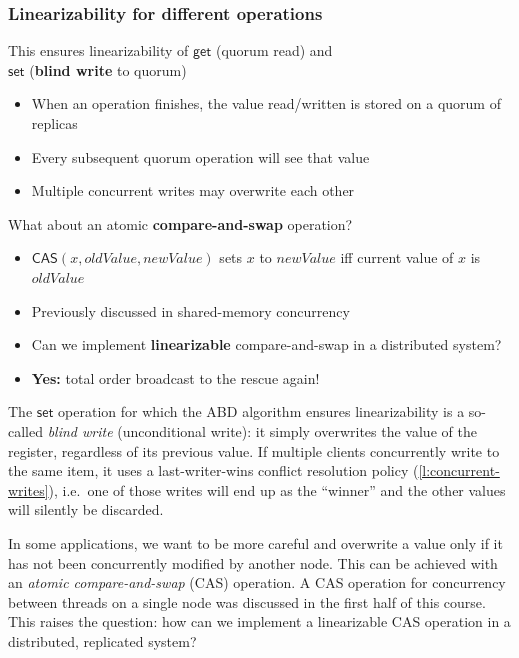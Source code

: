 \begin{frame}
    \label{s:cas-1}
    \frametitle{Linearizability for different operations}
    This ensures linearizability of $\mathsf{get}$ (quorum read) and\\$\mathsf{set}$ (\textbf{blind write} to quorum)\pause
    \begin{itemize}
        \item When an operation finishes, the value read/written is stored on a quorum of replicas
        \item Every subsequent quorum operation will see that value\pause
        \item Multiple concurrent writes may overwrite each other\\[1em]\pause
    \end{itemize}
    What about an atomic \textbf{compare-and-swap} operation?
    \begin{itemize}
        \item $\mathsf{CAS}(x, \mathit{oldValue}, \mathit{newValue})$ sets $x$ to $\mathit{newValue}$
            iff current value of $x$ is $\mathit{oldValue}$
        \item Previously discussed in shared-memory concurrency\pause
        \item Can we implement \textbf{linearizable} compare-and-swap in a distributed system?\pause
        \item \textbf{Yes:} total order broadcast to the rescue again!
    \end{itemize}
\end{frame}
\label{l:cas-1}

The $\mathsf{set}$ operation for which the ABD algorithm ensures linearizability is a so-called \emph{blind write} (unconditional write): it simply overwrites the value of the register, regardless of its previous value.
If multiple clients concurrently write to the same item, it uses a last-writer-wins conflict resolution policy (\autoref{l:concurrent-writes}), i.e.\ one of those writes will end up as the ``winner'' and the other values will silently be discarded.

In some applications, we want to be more careful and overwrite a value only if it has not been concurrently modified by another node.
This can be achieved with an \emph{atomic compare-and-swap} (CAS) operation.
A CAS operation for concurrency between threads on a single node was discussed in the first half of this course.
This raises the question: how can we implement a linearizable CAS operation in a distributed, replicated system?

